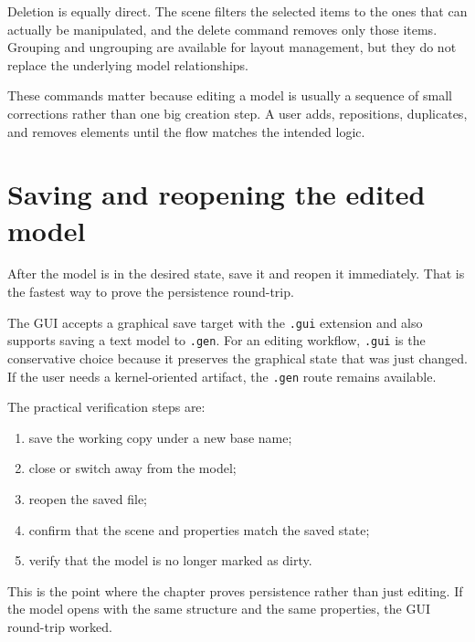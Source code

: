 Deletion is equally direct. The scene filters the selected items to the ones that can actually be
manipulated, and the delete command removes only those items. Grouping and ungrouping are available for
layout management, but they do not replace the underlying model relationships.

These commands matter because editing a model is usually a sequence of small corrections rather than one
big creation step. A user adds, repositions, duplicates, and removes elements until the flow matches the
intended logic.

\section{Saving and reopening the edited model}
\label{sec:model-editing-save-and-reopen}

After the model is in the desired state, save it and reopen it immediately. That is the fastest way to
prove the persistence round-trip.

The GUI accepts a graphical save target with the \texttt{.gui} extension and also supports saving a text
model to \texttt{.gen}. For an editing workflow, \texttt{.gui} is the conservative choice because it
preserves the graphical state that was just changed. If the user needs a kernel-oriented artifact, the
\texttt{.gen} route remains available.

The practical verification steps are:
\begin{enumerate}
\item save the working copy under a new base name;
\item close or switch away from the model;
\item reopen the saved file;
\item confirm that the scene and properties match the saved state;
\item verify that the model is no longer marked as dirty.
\end{enumerate}

This is the point where the chapter proves persistence rather than just editing. If the model opens with
the same structure and the same properties, the GUI round-trip worked.


